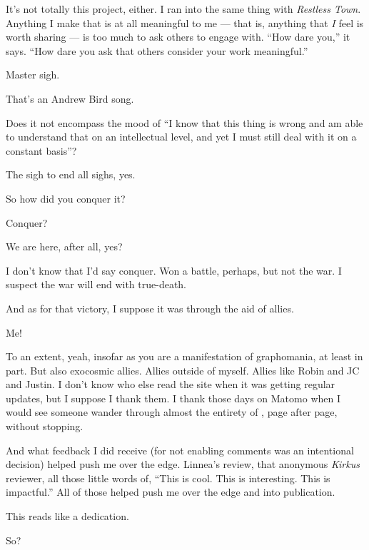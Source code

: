 \begin{paracol}{2}
\begin{rightcolumn}
  It's not totally this project, either. I ran into the same thing with \emph{Restless Town}. Anything I make that is at all meaningful to me --- that is, anything that \emph{I} feel is worth sharing --- is too much to ask others to engage with. ``How dare you,'' it says. ``How dare you ask that others consider your work meaningful.''

  \begin{ally}
    Master sigh.
  \end{ally}
  That's an Andrew Bird song.

  \begin{ally}
    Does it not encompass the mood of ``I know that this thing is wrong and am able to understand that on an intellectual level, and yet I must still deal with it on a constant basis''?
  \end{ally}
  The sigh to end all sighs, yes.

  \begin{ally}
    So how did you conquer it?
  \end{ally}
  Conquer?

  \begin{ally}
    We are here, after all, yes?
  \end{ally}
  I don't know that I'd say conquer. Won a battle, perhaps, but not the war. I suspect the war will end with true-death.

  And as for that victory, I suppose it was through the aid of allies.

  \begin{ally}
    Me!
  \end{ally}
  To an extent, yeah, insofar as you are a manifestation of graphomania, at least in part. But also exocosmic allies. Allies outside of myself. Allies like Robin and JC and Justin. I don't know who else read the site when it was getting regular updates, but I suppose I thank them. I thank those days on Matomo when I would see someone wander through almost the entirety of \allyId, page after page, without stopping.

  And what feedback I did receive (for not enabling comments was an intentional decision) helped push me over the edge. Linnea's review, that anonymous \emph{Kirkus} reviewer, all those little words of, ``This is cool. This is interesting. This is impactful.'' All of those helped push me over the edge and into publication.

  \begin{ally}
    This reads like a dedication.
  \end{ally}
  So?


\end{rightcolumn}
\end{paracol}
